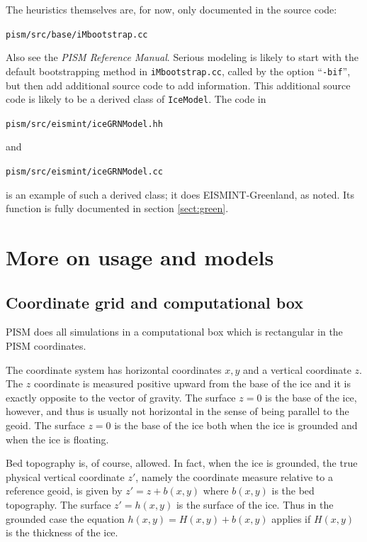 \documentclass[11pt,final]{amsart}
\begin{document}
The heuristics themselves are, for now, only documented in the source code:
\begin{center}\verb|pism/src/base/iMbootstrap.cc|\end{center}
\noindent Also see the \emph{PISM Reference Manual}.  Serious modeling is likely to start with the default bootstrapping method in \verb|iMbootstrap.cc|, called by the option ``\verb|-bif|'', but then add additional source code to add information.  This additional source code is likely to be a derived class of \verb|IceModel|.  The code in 
\begin{center}\verb|pism/src/eismint/iceGRNModel.hh|\end{center}
\noindent and
\begin{center}\verb|pism/src/eismint/iceGRNModel.cc|\end{center}
\noindent is an example of such a derived class; it does EISMINT-Greenland, as noted.  Its function is fully documented in section \ref{sect:green}.


\clearpage
\newpage
\section{More on usage and models}\label{sect:usage}

\subsection{Coordinate grid and computational box} \label{subsect:coords} PISM does all simulations in a computational box which is rectangular in the PISM coordinates.

The coordinate system has horizontal coordinates $x,y$ and a vertical coordinate $z$.  The $z$ coordinate is measured positive upward from the base of the ice and it is exactly opposite to the vector of gravity.  The surface $z=0$ is the base of the ice, however, and thus is usually not horizontal in the sense of being parallel to the geoid.   The surface $z=0$ is the base of the ice both when the ice is grounded and when the ice is floating.

Bed topography is, of course, allowed.  In fact, when the ice is grounded, the true physical vertical coordinate $z'$, namely the coordinate measure relative to a reference geoid, is given by $z'=z+b(x,y)$ where $b(x,y)$ is the bed topography.  The surface $z'=h(x,y)$ is the surface of the ice.  Thus in the grounded case the equation $h(x,y)=H(x,y)+b(x,y)$ applies if $H(x,y)$ is the thickness of the ice.
\end{document}
